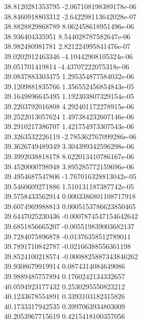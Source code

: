 {38.8120281353795 -2.067108198389178e-06
 \\
38.8460918803312 -2.642298113642028e-07
 \\
38.8828829868789 8.062458618951496e-06
 \\
38.936404335951 8.544028787582647e-06
 \\
38.982480981781 2.821224995841476e-07
 \\
39.0202912463346 -4.10442908105324e-06
 \\
39.051701419814 -4.43707222075318e-06
 \\
39.0837883303475 1.295354877584032e-06
 \\
39.1209881835766 1.356552456854843e-05
 \\
39.1649896645495 1.192303807329154e-05
 \\
39.2203792016808 4.292401172278915e-06
 \\
39.2522013057624 1.497384232607146e-06
 \\
39.2910217386707 1.421754973307543e-06
 \\
39.3263532226119 -2.785362767099286e-06
 \\
39.3626749489349 3.304399342596298e-06
 \\
39.3992038818178 8.622013410786167e-06
 \\
39.4520000798948 3.895285772159696e-06
 \\
39.4954687547806 -1.767016328813042e-05
 \\
39.5460609271886 1.510131187387742e-05
 \\
39.5758433562914 0.0003386801108717918
 \\
39.6074969988813 0.0005153786623850465
 \\
39.6447025230436 -0.0007874547154642642
 \\
39.6851856665207 -0.005519839003682137
 \\
39.7284075896878 -0.01376358512789011
 \\
39.7891710842787 -0.02166388556361198
 \\
39.8524100218574 -0.0008825887343846262
 \\
39.9308679919914 0.0874314084649086
 \\
39.9889485757894 0.1760242134332657
 \\
40.0594923177432 0.2530295550823212
 \\
40.1233678554891 0.3393103182315826
 \\
40.1733317942535 0.3997063934803009
 \\
40.2053967715619 0.4215418100357056
 \\
}
